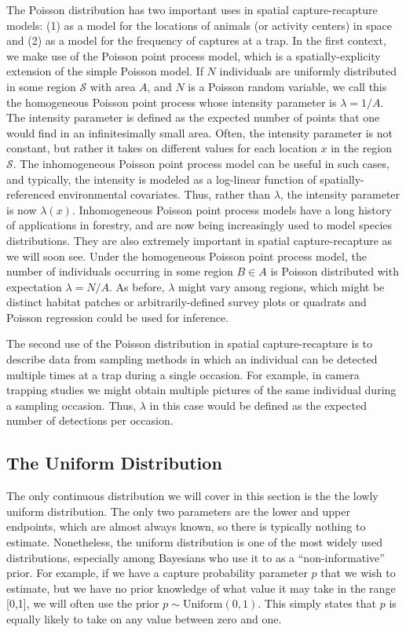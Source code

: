 The Poisson distribution has two important uses in spatial
capture-recapture models: (1) as a model for the locations of animals
(or activity centers) in space and (2) as a model for the frequency of
captures at a trap. In the first context, we
make use of the Poisson point process model, which is a
spatially-explicity extension of the simple Poisson model.
If $N$ individuals are uniformly distributed in some region
$\mathcal{S}$ with area $A$, and $N$ is a Poisson
random variable, we call this the homogeneous Poisson point process
whose intensity parameter is $\lambda = 1/A$. The intensity parameter
is defined as the expected number of points that one would find in an
infinitesimally small area. Often, the intensity parameter is not
constant, but rather it takes on different values for each location
$x$ in the region $\mathcal{S}$. The inhomogeneous Poisson point
process model can be useful in such cases, and typically, the
intensity is modeled as a log-linear function of spatially-referenced
environmental covariates. Thus, rather than $\lambda$, the intensity
parameter is now $\lambda(x)$. Inhomogeneous Poisson point process
models have a long history of applications in forestry, and are now
being increasingly used to model species distributions. They are also
extremely important in spatial capture-recapture as we will soon see.
Under the homogeneous Poisson point process model,
the number of individuals occurring in some
region $B \in A$ is Poisson distributed with expectation
$\lambda = N/A$. As before, $\lambda$ might vary among regions, which
might be distinct habitat patches or arbitrarily-defined survey plots or
quadrats and Poisson regression could be used for inference.

The second use of the Poisson distribution in spatial
capture-recapture is
to describe data from sampling methods in which an
individual can be detected multiple times at a trap during a single
occasion. For example, in camera trapping studies we might obtain
multiple pictures of the same individual during a sampling
occasion. Thus, $\lambda$ in this case would be defined as the
expected number of detections per occasion.


\subsection{The Uniform Distribution}

The only continuous distribution we will cover in this section is the
the lowly uniform distribution.
The only two parameters are the lower and upper endpoints,
which are almost always known, so there is typically nothing to
estimate. Nonetheless, the uniform
distribution is one of the most widely used distributions,
especially among Bayesians who use it to as a ``non-informative''
prior. For example, if we
have a capture probability parameter $p$ that we wish to estimate, but
we have no prior knowledge of what value it may take in the range
[0,1], we will often use the prior $p \sim \text{Uniform}(0,1)$. This
simply states that $p$ is equally likely to take on any value between
zero and one.

